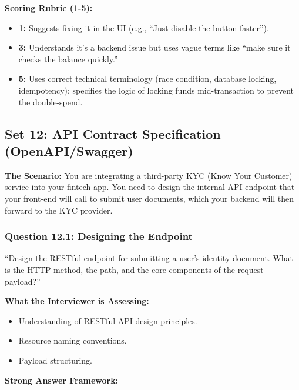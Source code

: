 \textbf{Scoring Rubric (1-5):}

\begin{itemize}
\tightlist
\item
  \textbf{1:} Suggests fixing it in the UI (e.g., ``Just disable the
  button faster'').
\item
  \textbf{3:} Understands it's a backend issue but uses vague terms like
  ``make sure it checks the balance quickly.''
\item
  \textbf{5:} Uses correct technical terminology (race condition,
  database locking, idempotency); specifies the logic of locking funds
  mid-transaction to prevent the double-spend.
\end{itemize}

\bigskip

\subsection{Set 12: API Contract Specification
(OpenAPI/Swagger)}\label{set-12-api-contract-specification-openapiswagger}

\textbf{The Scenario:} You are integrating a third-party KYC (Know Your
Customer) service into your fintech app. You need to design the internal
API endpoint that your front-end will call to submit user documents,
which your backend will then forward to the KYC provider.

\subsubsection{Question 12.1: Designing the
Endpoint}\label{question-12.1-designing-the-endpoint}

``Design the RESTful endpoint for submitting a user's identity document.
What is the HTTP method, the path, and the core components of the
request payload?''

\textbf{What the Interviewer is Assessing:}

\begin{itemize}
\tightlist
\item
  Understanding of RESTful API design principles.
\item
  Resource naming conventions.
\item
  Payload structuring.
\end{itemize}

\textbf{Strong Answer Framework:}


